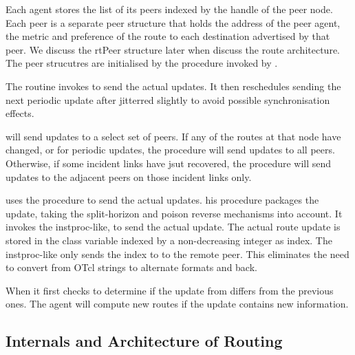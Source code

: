 \documentclass{article}
\begin{document}
Each agent stores the list of its peers indexed by the handle
of the peer node.
Each peer is a separate peer structure that holds
the address of the peer agent, the metric and preference
of the route to each destination advertised by that peer.
We discuss the rtPeer structure later
when discuss the route architecture.
The peer strucutres are initialised by the procedure
invoked by .

The routine 
invokes  to send the actual updates.
It then reschedules sending the next periodic update
after  jitterred slightly to avoid
possible synchronisation effects.

will send updates to a select set of peers.
If any of the routes at that node have changed, or for periodic updates,
the procedure will send updates to all peers.
Otherwise, if some incident links have jsut recovered,
the procedure will send updates to the adjacent peers on those incident
links only.

 uses the procedure
to send the actual updates.
his procedure packages the update, taking the
split-horizon and poison reverse mechanisms into account.
It invokes the instproc-like,
to send the actual update.
The actual route update is stored in the class variable
 indexed by a non-decreasing integer as index.
The instproc-like only sends the index to  to the remote peer.
This eliminates the need to convert from OTcl strings to alternate formats
and back.

When 
it first checks to determine if the update from differs from the previous
ones.
The agent will compute new routes if the update contains new information.


\subsection{Internals and Architecture of Routing}
\label{sec:rtg-internals}
\end{document}
